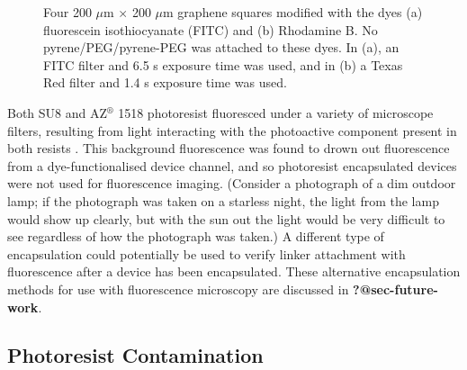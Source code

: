 \documentclass[
  a4paper,
]{scrbook}
\begin{document}
\begin{figure}
\begin{minipage}[t]{0.47\linewidth}
{{}

}

\subcaption{\label{fig-rhodamine}}
\end{minipage}%

\caption{\label{fig-FITC-rhodamine-B}Four 200 \(\mu\)m \(\times\) 200
\(\mu\)m graphene squares modified with the dyes (a) fluorescein
isothiocyanate (FITC) and (b) Rhodamine B. No pyrene/PEG/pyrene-PEG was
attached to these dyes. In (a), an FITC filter and 6.5 s exposure time
was used, and in (b) a Texas Red filter and 1.4 s exposure time was
used.}

\end{figure}

Both SU8 and AZ\(^\circledR\) 1518 photoresist fluoresced under a
variety of microscope filters, resulting from light interacting with the
photoactive component present in both resists \autocite{Pai2007}. This
background fluorescence was found to drown out fluorescence from a
dye-functionalised device channel, and so photoresist encapsulated
devices were not used for fluorescence imaging. (Consider a photograph
of a dim outdoor lamp; if the photograph was taken on a starless night,
the light from the lamp would show up clearly, but with the sun out the
light would be very difficult to see regardless of how the photograph
was taken.) A different type of encapsulation could potentially be used
to verify linker attachment with fluorescence after a device has been
encapsulated. These alternative encapsulation methods for use with
fluorescence microscopy are discussed in \textbf{?@sec-future-work}.

\hypertarget{sec-photoresist-contamination}{%
\subsection{Photoresist
Contamination}\label{sec-photoresist-contamination}}
\end{document}
